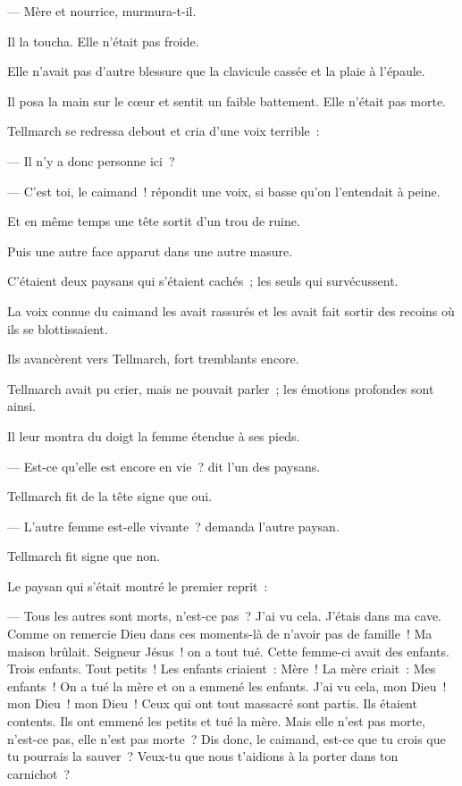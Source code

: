 \documentclass[french,twoside]{book} %
\begin{document}
— Mère et nourrice, murmura-t-il.\par
Il la toucha. Elle n’était pas froide.\par
Elle n’avait pas d’autre blessure que la clavicule cassée et la plaie à l’épaule.\par
Il posa la main sur le cœur et sentit un faible battement. Elle n’était pas morte.\par
 Tellmarch se redressa debout et cria d’une voix terrible :\par
— Il n’y a donc personne ici ?\par
— C’est toi, le caimand ! répondit une voix, si basse qu’on l’entendait à peine.\par
Et en même temps une tête sortit d’un trou de ruine.\par
Puis une autre face apparut dans une autre masure.\par
C’étaient deux paysans qui s’étaient cachés ; les seuls qui survécussent.\par
La voix connue du caimand les avait rassurés et les avait fait sortir des recoins où ils se blottissaient.\par
Ils avancèrent vers Tellmarch, fort tremblants encore.\par
Tellmarch avait pu crier, mais ne pouvait parler ; les émotions profondes sont ainsi.\par
Il leur montra du doigt la femme étendue à ses pieds.\par
— Est-ce qu’elle est encore en vie ? dit l’un des paysans.\par
Tellmarch fit de la tête signe que oui.\par
— L’autre femme est-elle vivante ? demanda l’autre paysan.\par
Tellmarch fit signe que non.\par
Le paysan qui s’était montré le premier reprit :\par
— Tous les autres sont morts, n’est-ce pas ? J’ai vu cela. J’étais dans ma cave. Comme on remercie Dieu dans ces moments-là de n’avoir pas de famille ! Ma maison brûlait. Seigneur Jésus ! on a tout tué. Cette femme-ci avait des enfants. Trois enfants. Tout petits !  Les enfants criaient : Mère ! La mère criait : Mes enfants ! On a tué la mère et on a emmené les enfants. J’ai vu cela, mon Dieu ! mon Dieu ! mon Dieu ! Ceux qui ont tout massacré sont partis. Ils étaient contents. Ils ont emmené les petits et tué la mère. Mais elle n’est pas morte, n’est-ce pas, elle n’est pas morte ? Dis donc, le caimand, est-ce que tu crois que tu pourrais la sauver ? Veux-tu que nous t’aidions à la porter dans ton carnichot ?\par
\end{document}
